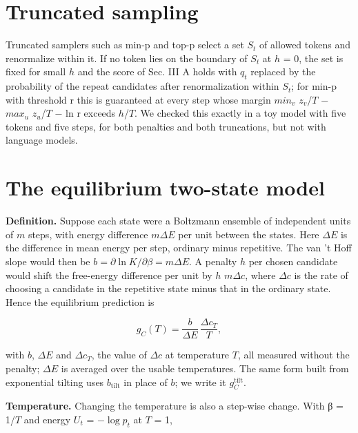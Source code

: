 \documentclass[aps,prx,onecolumn,superscriptaddress,longbibliography]{revtex4-2}
\begin{document}
\section{Truncated sampling}

Truncated samplers such as min-p \cite{2407.01082} and top-p \cite{1904.09751} select a set \(S_{t}\) of allowed tokens and renormalize within it. If no token lies on the boundary of \(S_{t}\) at \(h\) = 0, the set is fixed for small \(h\) and the score of Sec. III A holds with \(q_{t}\) replaced by the probability of the repeat candidates after renormalization within \(S_{t}\); for min-p with threshold r this is guaranteed at every step whose margin \(min_{v}\) \textbar{}\(z_{v}\)/\(T\) − \(max_{u}\) \(z_{u}\)/\(T\) − ln r\textbar{} exceeds \textbar{}\(h\)\textbar/\(T\). We checked this exactly in a toy model with five tokens and five steps, for both penalties and both truncations, but not with language models.

\section{The equilibrium two-state model}

\textbf{Definition.} Suppose each state were a Boltzmann ensemble of independent units of \(m\) steps, with energy difference \(m\Delta E\) per unit between the states. Here \(\Delta E\) is the difference in mean energy per step, ordinary minus repetitive. The van 't Hoff slope would then be \(b=\partial\ln K/\partial\beta=m\Delta E\). A penalty \(h\) per chosen candidate would shift the free-energy difference per unit by \(h\) \(m\Delta c\), where \(\Delta c\) is the rate of choosing a candidate in the repetitive state minus that in the ordinary state. Hence the equilibrium prediction is

\begin{equation}g_C(T)=\frac{b}{\Delta E}\,\frac{\Delta c_T}{T},\end{equation}

with \(b\), \(\Delta E\) and \(\Delta c_{T}\), the value of \(\Delta c\) at temperature \(T\), all measured without the penalty; \(\Delta E\) is averaged over the usable temperatures. The same form built from exponential tilting uses \(b_{\mathrm{tilt}}\) in place of \(b\); we write it \(g_{C}^{\mathrm{tilt}}\).

\textbf{Temperature.} Changing the temperature is also a step-wise change. With β = 1/\(T\) and energy \(U_{t}\) = \(-\log p_t\) at \(T\) = 1,
\end{document}
